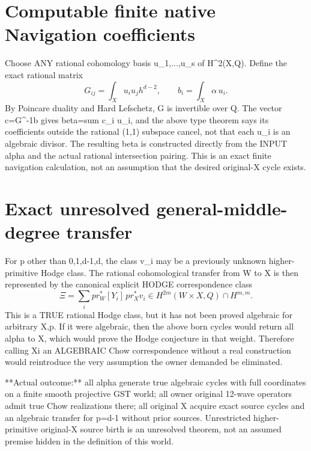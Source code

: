\documentclass[11pt]{article}
\begin{document}
\section{Computable finite native Navigation coefficients}
Choose ANY rational cohomology basis
u_1,...,u_s of H^2(X,Q).
Define the exact rational matrix
\[
G_{ij}=\int_X u_i u_j h^{d-2},
\qquad b_i=\int_X\alpha\,u_i.
\]
By Poincare duality and Hard Lefschetz,
G is invertible over Q.
The vector c=G^{-1}b gives
beta=sum c_i u_i, and the above
type theorem says its coefficients
outside the rational (1,1) subspace
cancel, not that each u_i is an
algebraic divisor. The resulting beta
is constructed directly from the
INPUT alpha and the actual rational
intersection pairing.
This is an exact finite navigation
calculation, not an assumption that
the desired original-X cycle exists.

\section{Exact unresolved general-middle-degree transfer}
For p other than 0,1,d-1,d, the class
v_i may be a previously unknown
higher-primitive Hodge class.
The rational cohomological transfer
from W to X is then represented by
the canonical explicit HODGE
correspondence class
\[
\Xi=\sum_i pr_W^*[Y_i]\,pr_X^*v_i
\in H^{2m}(W\times X,Q)\cap H^{m,m}.
\]
This is a TRUE rational Hodge class,
but it has not been proved algebraic
for arbitrary X,p. If it were algebraic,
then the above born cycles would return
all alpha to X, which would prove the
Hodge conjecture in that weight.
Therefore calling Xi an ALGEBRAIC Chow
correspondence without a real construction
would reintroduce the very assumption
the owner demanded be eliminated.

**Actual outcome:** all alpha generate
true algebraic cycles with full coordinates
on a finite smooth projective GST world;
all owner original 12-wave operators
admit true Chow realizations there;
all original X acquire exact source
cycles and an algebraic transfer for
p=d-1 without prior sources.
Unrestricted higher-primitive original-X
source birth is an unresolved theorem,
not an assumed premise hidden in the
definition of this world.
\end{document}
